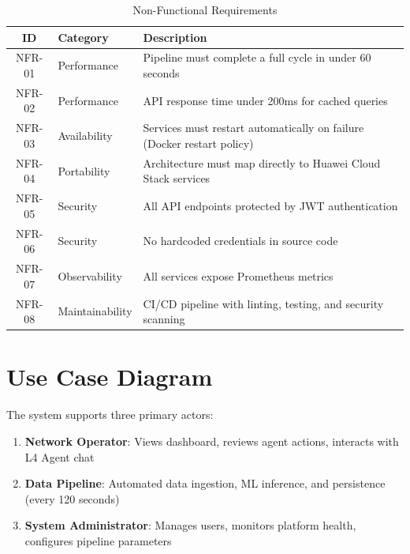 \begin{table}[H]
\centering
\caption{Non-Functional Requirements}
\label{tab:nonfunc-req}
\begin{tabular}{@{}clp{8cm}@{}}
\toprule
\textbf{ID} & \textbf{Category} & \textbf{Description} \\
\midrule
NFR-01 & Performance & Pipeline must complete a full cycle in under 60 seconds \\
NFR-02 & Performance & API response time under 200ms for cached queries \\
NFR-03 & Availability & Services must restart automatically on failure (Docker restart policy) \\
NFR-04 & Portability & Architecture must map directly to Huawei Cloud Stack services \\
NFR-05 & Security & All API endpoints protected by JWT authentication \\
NFR-06 & Security & No hardcoded credentials in source code \\
NFR-07 & Observability & All services expose Prometheus metrics \\
NFR-08 & Maintainability & CI/CD pipeline with linting, testing, and security scanning \\
\bottomrule
\end{tabular}
\end{table}

\section{Use Case Diagram}

The system supports three primary actors:

\begin{enumerate}
    \item \textbf{Network Operator}: Views dashboard, reviews agent actions, interacts with L4 Agent chat
    \item \textbf{Data Pipeline}: Automated data ingestion, ML inference, and persistence (every 120 seconds)
    \item \textbf{System Administrator}: Manages users, monitors platform health, configures pipeline parameters
\end{enumerate}

